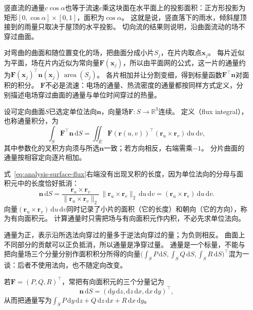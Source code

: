 竖直流的通量$c\cos\alpha$也等于流速$c$乘这块面在水平面上的投影面积：正方形投影为矩形$[0,\cos\alpha]\times[0,1]$，面积为$\cos\alpha$。
这就是说，竖直落下的雨水，倾斜屋顶接到的雨量只取决于屋顶的水平投影。
切向流的结果则说明，沿曲面流动的场不穿过曲面。

对弯曲的曲面和随位置变化的场，把曲面分成小片$S_j$，在片内取点$\bm x_j$。
每片近似为平面，场在片内近似为常向量$\bm F(\bm x_j)$，所以由平面网的公式，这一片的通量约为$\bm F(\bm x_j)^\top\bm n(\bm x_j)\,\operatorname{area}(S_j)$。
各片相加并让分割变细，得到标量函数$\bm F^\top\bm n$对面积的积分。
$\bm F$不必是流速：电场的通量、热流密度的通量都按同样方式定义，分别描述电场穿过曲面的通量与单位时间穿过的热量。

\begin{definition}[第二类曲面积分]
\label{def:analysis-surface-flux-integral}
设可定向曲面$S$已选定单位法向$\bm n$，向量场$\bm F:S\to\mathbb R^3$连续。
定义（flux integral），也称通量积分，为
\begin{equation}
 \int_S\bm F^\top\bm n\,\mathrm dS
 =\iint_E\bm F(\bm r(u,v))^\top(\bm r_u\times\bm r_v)\,\mathrm du\,\mathrm dv,
 \label{eq:analysis-surface-flux}
\end{equation}
其中参数化的叉积方向须与所选$\bm n$一致；若方向相反，右端需乘$-1$。
分片曲面的通量按相容定向逐片相加。
\end{definition}

式~\eqref{eq:analysis-surface-flux}右端没有出现叉积的长度，因为单位法向的分母与面积元中的长度恰好抵消：
\[
 \bm n\,\mathrm dS
 =\frac{\bm r_u\times\bm r_v}{\lVert\bm r_u\times\bm r_v\rVert_2}\,\lVert\bm r_u\times\bm r_v\rVert_2\,\mathrm du\,\mathrm dv
 =(\bm r_u\times\bm r_v)\,\mathrm du\,\mathrm dv.
\]
向量$(\bm r_u\times\bm r_v)\,\mathrm du\,\mathrm dv$同时记录了小片的面积（它的长度）和朝向（它的方向），称为有向面积元。
计算通量时只需把场与有向面积元作内积，不必先求单位法向。

通量为正，表示沿所选法向穿过的量多于逆法向穿过的量；为负则相反。
曲面上不同部分的贡献可以正负抵消，所以通量是净穿过量。
通量是一个标量，不能与把向量场三个分量分别作面积积分所得的向量$\bigl(\int_SP\,\mathrm dS,\int_SQ\,\mathrm dS,\int_SR\,\mathrm dS\bigr)^\top$混为一谈：后者不使用法向，也不随定向改变。

若$\bm F=(P,Q,R)^\top$，常把有向面积元的三个分量记为
\[
 \bm n\,\mathrm dS=(\mathrm dy\,\mathrm dz,\mathrm dz\,\mathrm dx,\mathrm dx\,\mathrm dy)^\top,
\]
从而把通量写为$\int_SP\,\mathrm dy\,\mathrm dz+Q\,\mathrm dz\,\mathrm dx+R\,\mathrm dx\,\mathrm dy$。

